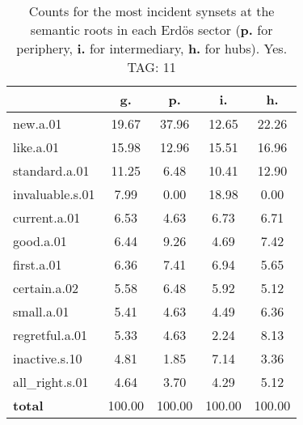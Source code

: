 \begin{table}[h!]
\begin{center}
\begin{tabular}{| l || c | c | c | c |}\hline
 & {\bf g.} & {\bf p.} & {\bf i.} & {\bf h.} \\\hline\hline
new.a.01 & 19.67  & 37.96  & 12.65  & 22.26 \\\hline
like.a.01 & 15.98  & 12.96  & 15.51  & 16.96 \\\hline
standard.a.01 & 11.25  & 6.48  & 10.41  & 12.90 \\\hline
invaluable.s.01 & 7.99  & 0.00  & 18.98  & 0.00 \\\hline
current.a.01 & 6.53  & 4.63  & 6.73  & 6.71 \\\hline
good.a.01 & 6.44  & 9.26  & 4.69  & 7.42 \\\hline
first.a.01 & 6.36  & 7.41  & 6.94  & 5.65 \\\hline
certain.a.02 & 5.58  & 6.48  & 5.92  & 5.12 \\\hline
small.a.01 & 5.41  & 4.63  & 4.49  & 6.36 \\\hline
regretful.a.01 & 5.33  & 4.63  & 2.24  & 8.13 \\\hline
inactive.s.10 & 4.81  & 1.85  & 7.14  & 3.36 \\\hline
all\_right.s.01 & 4.64  & 3.70  & 4.29  & 5.12 \\\hline\hline
{{\bf total}} & 100.00  & 100.00  & 100.00  & 100.00 \\\hline
\end{tabular}
\caption{Counts for the most incident synsets at the semantic roots in each Erd\"os sector ({\bf p.} for periphery, {\bf i.} for intermediary, {\bf h.} for hubs). Yes. TAG: 11}
\end{center}
\end{table}